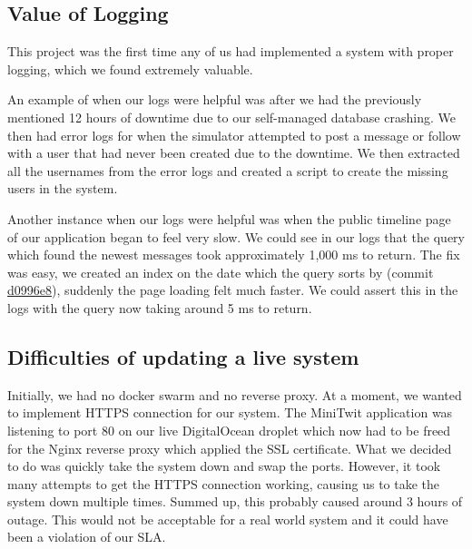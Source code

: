 
\subsection{Value of Logging}
This project was the first time any of us had implemented a system with proper logging, which we found extremely valuable.

An example of when our logs were helpful was after we had the previously mentioned 12 hours of downtime due to our self-managed database crashing. We then had error logs for when the simulator attempted to post a message or follow with a user that had never been created due to the downtime. We then extracted all the usernames from the error logs and created a script to create the missing users in the system.

Another instance when our logs were helpful was when the public timeline page of our application began to feel very slow. We could see in our logs that the query which found the newest messages took approximately 1,000 ms to return. The fix was easy, we created an index on the date which the query sorts by (commit \href{https://github.com/NiclasHjortkjaer/itu-minitwit/commit/d0996e8471bcbf364be5260702bc41719452bbca}{d0996e8}), suddenly the page loading felt much faster. We could assert this in the logs with the query now taking around 5 ms to return.

\subsection{Difficulties of updating a live system}
Initially, we had no docker swarm and no reverse proxy. At a moment, we wanted to implement HTTPS connection for our system. The MiniTwit application was listening to port 80 on our live DigitalOcean droplet which now had to be freed for the Nginx reverse proxy which applied the SSL certificate. What we decided to do was quickly take the system down and swap the ports. However, it took many attempts to get the HTTPS connection working, causing us to take the system down multiple times. Summed up, this probably caused around 3 hours of outage. This would not be acceptable for a real world system and it could have been a violation of our SLA.

